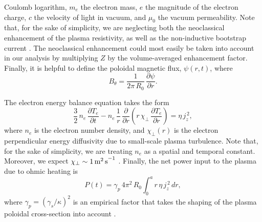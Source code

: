 \documentclass{iopjournal}
\begin{document}
Coulomb logarithm, $m_e$ the electron mass, $e$ the magnitude of the electron charge, $c$ the velocity of light in vacuum, and
$\mu_0$ the vacuum permeability. 
Note that, for the sake of simplicity, we are neglecting both the neoclassical enhancement of the plasma resistivity, as well as 
the non-inductive bootstrap current \cite{fitz1}. The neoclassical  enhancement could most easily be taken into account in our analysis by multiplying $Z$
 by the volume-averaged enhancement factor. 
 Finally, it is helpful to define the poloidal magnetic flux, $\psi(r,t)$, where 
\begin{equation}
B_\theta =  \frac{1}{2\pi\,R_0}\,\frac{\partial\psi}{\partial r}.
\end{equation}

The electron energy balance equation takes the form\,\cite{fitz}
\begin{equation}
\frac{3}{2}\,n_e\,\frac{\partial T_e}{\partial t} - n_e\,\frac{1}{r}\,\frac{\partial}{\partial r}\left(r\,\chi_\perp\,\frac{\partial T_e}{\partial r}\right)
 = \eta\,j_z^{\,2},
 \end{equation}
 where $n_e$ is the electron number density, and $\chi_\perp(r)$ is the electron perpendicular energy diffusivity due to small-scale plasma turbulence. 
 Note that, for the sake of simplicity, we are treating $n_e$ as a spatial and temporal constant. Moreover, we expect $\chi_\perp \sim 1\,{\rm m^2\,s}^{-1}$ \cite{book}.
 Finally, the net power input to the plasma due to ohmic heating is
 \begin{equation}
 P(t) = \gamma_p\,4\pi^2\,R_0\int_0^a r\,\eta\,j_z^{\,2}\,dr,
 \end{equation}
 where $\gamma_p= (\gamma_s/\kappa)^2$ is an empirical factor that takes the shaping of the plasma poloidal cross-section into account \cite{uckam}.
 
\end{document}
